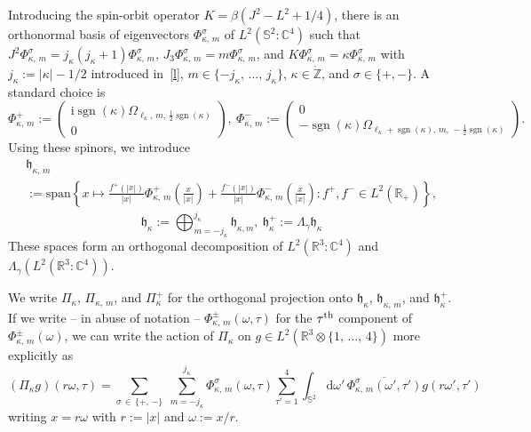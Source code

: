 \documentclass[10pt]{amsart}
\theoremstyle{definition}
\DeclareMathOperator{\sgn}{sgn}
\newcommand{\spanl}{\mathrm{span}}
\newcommand*\rd{\mathrm{d}}
\newcommand*\ri{\mathrm{i}}
\newcommand{\bbS}{\mathbb{S}}
\newcommand*\cz{\mathbb{C}}
\newcommand*\gz{\mathbb{Z}}
\newcommand*\rz{\mathbb{R}}
\newcommand*\zp{\dot{\gz}}
\newcommand*\gh{\mathfrak{h}}
\newcommand*\ghpk{{\gh^+_\kappa}}
\begin{document}
Introducing the spin-orbit operator $K=\beta(J^2-L^2+1/4)$, there is an orthonormal basis of eigenvectors $\Phi^\sigma_{\kappa,\,m}$ of $L^2(\bbS^2:\cz^4)$ such that $J^2\Phi^\sigma_{\kappa,\,m}=j_\kappa(j_\kappa+1)\Phi^\sigma_{\kappa,\,m}$, $J_3\Phi^\sigma_{\kappa,\,m}=m\Phi^\sigma_{\kappa,\,m}$, and $K\Phi^\sigma_{\kappa,\,m}=\kappa\Phi^\sigma_{\kappa,\,m}$ with $j_\kappa:=|\kappa|-1/2$ introduced in~\eqref{l}, $m\in\{-j_\kappa,\,\dots,\,j_\kappa\}$, $\kappa\in\zp$, and $\sigma\in\{+,-\}$. A standard choice is
\begin{equation}\label{fi}
\Phi^+_{\kappa,\,m} := \left(
\begin{matrix}
\ri\sgn(\kappa)\Omega_{\ell_\kappa,\,m,\,\frac12\sgn(\kappa)}\\
0
\end{matrix}
\right), \
\Phi^-_{\kappa,\,m}:=\left(
\begin{matrix}
0\\
-\sgn(\kappa)\Omega_{\ell_\kappa+\sgn(\kappa),\,m,\,-\frac12\sgn(\kappa)}
\end{matrix}
\right).
\end{equation}
Using these spinors, we introduce
\begin{multline}\label{a3}
\gh_{\kappa,\,m}\\
 :=\spanl\left\{x\mapsto \frac{f^+(|x|)}{|x|} \Phi_{\kappa,\,m}^+\left(\frac x{|x|}\right) + \frac{f^-(|x|)}{|x|}\Phi_{\kappa,\,m}^-\left(\frac x{|x|}\right):f^+,f^-\in L^2\left(\rz_+\right)\right\},
\end{multline}
\begin{equation}\label{a2}
\gh_\kappa:= \bigoplus_{m=-j_\kappa}^{j_\kappa}\gh_{\kappa,m},\ \gh_\kappa^+:=\Lambda_\gamma\gh_\kappa
\end{equation}
These spaces form an orthogonal decomposition of $L^2(\rz^3:\cz^4)$ and $\Lambda_\gamma(L^2(\rz^3:\cz^4))$.

We write $\Pi_\kappa$, $\Pi_{\kappa,\,m}$, and $\Pi_\kappa^+$ for the orthogonal projection onto $\gh_{\kappa}$, $\gh_{\kappa,\,m}$, and $\ghpk$. If we write -- in abuse of notation -- $\Phi_{\kappa,\,m}^\pm(\omega,\tau)$ for the $\tau^{\rm th}$ component of $\Phi_{\kappa,\,m}^\pm(\omega)$, we can write the action of $\Pi_\kappa$ on $g\in L^2(\rz^3\otimes\{1,\,\dots,\,4\})$ more explicitly as
\begin{equation}\label{a1}
\left(\Pi_\kappa g\right)\left(r\omega,\tau\right) = \sum_{\sigma\,\in\,\{+,\,-\}}\;\sum_{m=-j_\kappa}^{j_\kappa} \Phi^\sigma_{\kappa,\,m}\left(\omega,\tau\right)
\sum_{\tau'=1}^4\int_{\bbS^2}\rd \omega'\, \overline{ \Phi^\sigma_{\kappa,\,m}\left(\omega',\tau'\right)}g\left(r\omega',\tau'\right)
\end{equation}
writing $x=r\omega$ with $r:=|x|$ and $\omega:=x/r$.
\end{document}
